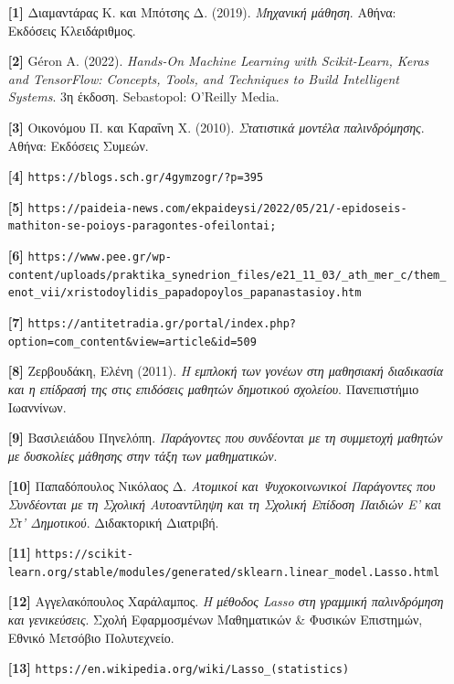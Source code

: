 \documentclass[12pt]{article}
\begin{document}
\begin{itemize}[label={}, leftmargin=2.8em, itemsep=1em, labelsep=0pt, itemindent=0pt, align=left]

\item [\textbf{[1]}] Διαμαντάρας Κ. και Μπότσης Δ. (2019). \textit{Μηχανική μάθηση}. Αθήνα: Εκδόσεις Κλειδάριθμος.

\item [\textbf{[2]}] Géron A. (2022). \textit{Hands-On Machine Learning with Scikit-Learn, Keras and TensorFlow: Concepts, Tools, and Techniques to Build Intelligent Systems}. 3η έκδοση. Sebastopol: O’Reilly Media.

\item [\textbf{[3]}] Οικονόμου Π. και Καραΐνη Χ. (2010). \textit{Στατιστικά μοντέλα παλινδρόμησης}. Αθήνα: Εκδόσεις Συμεών.

\item [\textbf{[4]}] \texttt{https://blogs.sch.gr/4gymzogr/?p=395}

\item [\textbf{[5]}] \texttt{https://paideia-news.com/ekpaideysi/2022/05/21/\xamiles-epidoseis-mathiton-se-poioys-paragontes-ofeilontai;}

\item [\textbf{[6]}] \texttt{https://www.pee.gr/wp-content/uploads/praktika\_synedrion\_files/e21\_11\_03/\sin\_ath\_mer\_c/them\_enot\_vii/xristodoylidis\_papadopoylos\_papanastasioy.htm}

\item [\textbf{[7]}] \texttt{https://antitetradia.gr/portal/index.php?option=com\_content&view=article&id=509}

\item [\textbf{[8]}] Ζερβουδάκη, Ελένη (2011). \textit{Η εμπλοκή των γονέων στη μαθησιακή διαδικασία και η επίδρασή της στις επιδόσεις μαθητών δημοτικού σχολείου}. Πανεπιστήμιο Ιωαννίνων.

\item [\textbf{[9]}] Βασιλειάδου Πηνελόπη. \textit{Παράγοντες που συνδέονται με τη συμμετοχή μαθητών με δυσκολίες μάθησης στην τάξη των μαθηματικών}.

\item [\textbf{[10]}] Παπαδόπουλος Νικόλαος Δ. \textit{Ατομικοί και Ψυχοκοινωνικοί Παράγοντες που Συνδέονται με τη Σχολική Αυτοαντίληψη και τη Σχολική Επίδοση Παιδιών Ε’ και Στ’ Δημοτικού}. Διδακτορική Διατριβή.

\item [\textbf{[11]}] \texttt{https://scikit-learn.org/stable/modules/generated/sklearn.linear\_model.Lasso.html}

\item [\textbf{[12]}] Αγγελακόπουλος Χαράλαμπος. \textit{Η μέθοδος Lasso στη γραμμική παλινδρόμηση και γενικεύσεις}. Σχολή Εφαρμοσμένων Μαθηματικών \& Φυσικών Επιστημών, Εθνικό Μετσόβιο Πολυτεχνείο.

\item [\textbf{[13]}] \texttt{https://en.wikipedia.org/wiki/Lasso\_(statistics)}

\end{itemize}
\end{document}
